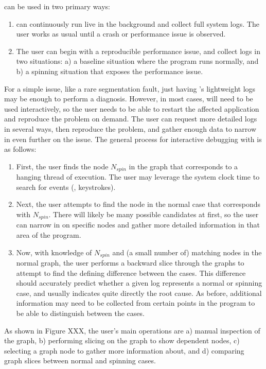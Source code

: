 \xxx can be used in two primary ways:
\begin{enumerate}
    \item \xxx can continuously run live in the background and collect full
    system logs. The user works as usual until a crash or performance issue is
    observed.

    \item The user can begin with a reproducible performance issue, and collect
    logs in two situations: a) a baseline situation where the program runs
    normally, and b) a spinning situation that exposes the performance issue.

\end{enumerate}
For a simple issue, like a rare segmentation fault, just having \xxx's lightweight logs may be enough to perform a diagnosis.
However, in most cases, \xxx will need to be used interactively, so the user needs to be able to restart the affected application and reproduce the problem on demand.
The user can request more detailed logs in several ways, then reproduce the problem, and gather enough data to narrow in even further on the issue.
The general process for interactive debugging with \xxx is as follows:
\begin{enumerate}
    \item First, the user finds the node \emph{$N_{spin}$} in the \xxx graph
    that corresponds to a hanging thread of execution. The user may leverage
    the system clock time to search for events (\eg, keystrokes).

    \item Next, the user attempts to find the node in the normal case that
    corresponds with $N_{spin}$. There will likely be many possible candidates
    at first, so the user can narrow in on specific nodes and gather more
    detailed information in that area of the program.

    \item Now, with knowledge of $N_{spin}$ and (a small number of) matching
    nodes in the normal graph, the user performs a backward slice through the
    graphs to attempt to find the defining difference between the cases. This
    difference should accurately predict whether a given log represents a
    normal or spinning case, and usually indicates quite directly the root
    cause. As before, additional information may need to be collected from
    certain points in the program to be able to distinguish between the cases.

\end{enumerate}
As shown in Figure XXX, the user's main operations are a) manual inspection of
the graph, b) performing slicing on the graph to show dependent nodes, c)
selecting a graph node to gather more information about, and d) comparing graph
slices between normal and spinning cases.
